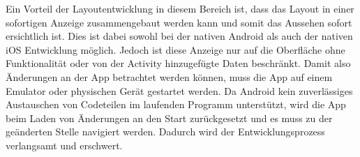 Ein Vorteil der Layoutentwicklung in diesem Bereich ist, dass das Layout in einer sofortigen Anzeige zusammengebaut werden kann und somit das Aussehen sofort ersichtlich ist. Dies ist dabei sowohl bei der nativen Android als auch der nativen iOS Entwicklung möglich. 
Jedoch ist diese Anzeige nur auf die Oberfläche ohne Funktionalität oder von der Activity hinzugefügte Daten beschränkt. 
Damit also Änderungen an der App betrachtet werden können, muss die App auf einem Emulator oder physischen Gerät gestartet werden.
Da Android kein zuverlässiges Austauschen von Codeteilen im laufenden Programm unterstützt, wird die App beim Laden von Änderungen an den Start zurückgesetzt und es muss zu der geänderten Stelle navigiert werden. 
Dadurch wird der Entwicklungsprozess verlangsamt und erschwert.

